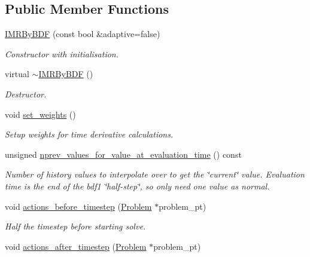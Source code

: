 \subsection*{Public Member Functions}
\begin{DoxyCompactItemize}
\item 
\hyperlink{classoomph_1_1IMRByBDF_a9b39aef878c283d7e7c5ad23ac7c8213}{I\+M\+R\+By\+B\+DF} (const bool \&adaptive=false)
\begin{DoxyCompactList}\small\item\em Constructor with initialisation. \end{DoxyCompactList}\item 
virtual \hyperlink{classoomph_1_1IMRByBDF_aaa70e7e8090f3e454bc392e733b3185a}{$\sim$\+I\+M\+R\+By\+B\+DF} ()
\begin{DoxyCompactList}\small\item\em Destructor. \end{DoxyCompactList}\item 
void \hyperlink{classoomph_1_1IMRByBDF_a6060b6098113085753083a2dc53723ee}{set\+\_\+weights} ()
\begin{DoxyCompactList}\small\item\em Setup weights for time derivative calculations. \end{DoxyCompactList}\item 
unsigned \hyperlink{classoomph_1_1IMRByBDF_a4fb7f902b1a266b19cfdfe640d4c78d5}{nprev\+\_\+values\+\_\+for\+\_\+value\+\_\+at\+\_\+evaluation\+\_\+time} () const
\begin{DoxyCompactList}\small\item\em Number of history values to interpolate over to get the \char`\"{}current\char`\"{} value. Evaluation time is the end of the bdf1 \char`\"{}half-\/step\char`\"{}, so only need one value as normal. \end{DoxyCompactList}\item 
void \hyperlink{classoomph_1_1IMRByBDF_abc155a68889d297f732a083d911b4627}{actions\+\_\+before\+\_\+timestep} (\hyperlink{classoomph_1_1Problem}{Problem} $\ast$problem\+\_\+pt)
\begin{DoxyCompactList}\small\item\em Half the timestep before starting solve. \end{DoxyCompactList}\item 
void \hyperlink{classoomph_1_1IMRByBDF_a1eb1b47643bf37e27c478c6987c7716d}{actions\+\_\+after\+\_\+timestep} (\hyperlink{classoomph_1_1Problem}{Problem} $\ast$problem\+\_\+pt)
\end{DoxyCompactItemize}
